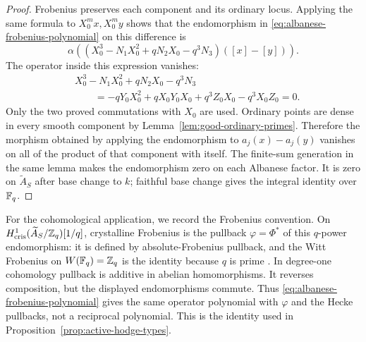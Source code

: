 \begin{proof}
Frobenius preserves each component and its ordinary locus.
Applying the same formula to \(X_0^m x,X_0^m y\) shows that
the endomorphism in \eqref{eq:albanese-frobenius-polynomial}
on this difference is
\[
\alpha\!\left(
(X_0^3-N_1X_0^2+qN_2X_0-q^3N_3)([x]-[y])
\right).
\]
The operator inside this expression vanishes:
\[
\begin{aligned}
&X_0^3-N_1X_0^2+qN_2X_0-q^3N_3\\
&\qquad=-qY_0X_0^2+qX_0Y_0X_0
        +q^3Z_0X_0-q^3X_0Z_0=0.
\end{aligned}
\]
Only the two proved commutations with \(X_0\) are used.
Ordinary points are dense in every smooth component by
Lemma~\ref{lem:good-ordinary-primes}.  Therefore the morphism
obtained by applying the endomorphism to
\(a_j(x)-a_j(y)\) vanishes on all of the product of that
component with itself.  The finite-sum generation in the same
lemma makes the endomorphism zero on each Albanese factor.
It is zero on \(\widetilde A_S\) after base change to \(k\);
faithful base change gives the integral identity over \(\mathbb{F}_q\).
\end{proof}

For the cohomological application, we record the Frobenius convention.  On
\(H^1_{\mathrm{cris}}(\widetilde A_S/\mathbb{Z}_q)[1/q]\), crystalline
Frobenius is the pullback \(\varphi=\Phi^*\) of this \(q\)-power
endomorphism: it is defined by absolute-Frobenius pullback, and
the Witt Frobenius on \(W(\mathbb{F}_q)=\mathbb{Z}_q\) is the identity because
\(q\) is prime \cite[Tag~07N0]{StacksProject}.  In degree-one
cohomology pullback is additive in abelian homomorphisms.
It reverses composition, but the displayed endomorphisms
commute.  Thus \eqref{eq:albanese-frobenius-polynomial} gives
the same operator polynomial with \(\varphi\) and the Hecke
pullbacks, not a reciprocal polynomial.  This is the identity
used in Proposition~\ref{prop:active-hodge-types}.
